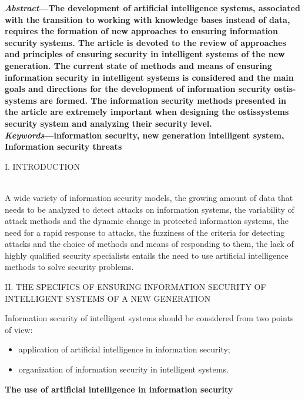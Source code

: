 \documentclass{article}
\begin{document}
\begin{multicols}{2}

\textbf{
  \textit{Abstract}—The development of artificial intelligence systems, associated with the transition to working with
knowledge bases instead of data, requires the formation of
new approaches to ensuring information security systems.
The article is devoted to the review of approaches and
principles of ensuring security in intelligent systems of
the new generation. The current state of methods and
means of ensuring information security in intelligent systems
is considered and the main goals and directions for
the development of information security ostis-systems are
formed. The information security methods presented in the
article are extremely important when designing the ostissystems security system and analyzing their security level.
}\\

\textbf{ \textit{Keywords}—information security, new generation intelligent system, Information security threats
}
\begin{center}
 I. INTRODUCTION
 \end{center}\\

 A wide variety of information security models, the
growing amount of data that needs to be analyzed to
detect attacks on information systems, the variability of
attack methods and the dynamic change in protected
information systems, the need for a rapid response to
attacks, the fuzziness of the criteria for detecting attacks
and the choice of methods and means of responding to
them, the lack of highly qualified security specialists
entails the need to use artificial intelligence methods to
solve security problems.
\begin{center}
 II. THE SPECIFICS OF ENSURING INFORMATION
SECURITY OF INTELLIGENT SYSTEMS OF A NEW
GENERATION
 \end{center}
 
 Information security of intelligent systems should be
considered from two points of view:
\begin{itemize}[noitemsep]
    \item application of artificial intelligence in information
security;
    \item organization of information security in intelligent
systems.
\end{itemize}

\textbf{The use of artificial intelligence in information
security}


\end{multicols}
\end{document}
